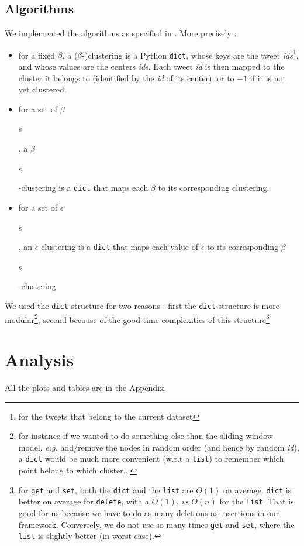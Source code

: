 \documentclass[a4paper,10pt]{article}
\begin{document}
	\subsection{Algorithms}
		We implemented the algorithms as specified in \cite{Chan2017}. More precisely :
		\begin{itemize}
			\item for a fixed $\beta$, a ($\beta$-)clustering is a Python \texttt{dict}, whose keys are the tweet \textit{ids}\footnote{for the tweets that belong to the current dataset}, and whose values are the centers \textit{ids}. Each tweet \textit{id} is then mapped to the cluster it belongs to (identified by the \textit{id} of its center), or to $-1$ if it is not yet clustered.
			\item for a set of $\beta$\begin{tiny}s\end{tiny}, a $\beta$\begin{tiny}s\end{tiny}-clustering is a \texttt{dict} that maps each $\beta$ to its corresponding clustering.
			\item for a set of $\epsilon$\begin{tiny}s\end{tiny}, an $\epsilon$-clustering is a \texttt{dict} that maps each value of $\epsilon$ to its corresponding $\beta$\begin{tiny}s\end{tiny}-clustering
		\end{itemize}
		We used the \texttt{dict} structure for two reasons : first the \texttt{dict} structure is more modular\footnote{for instance if we wanted to do something else than the sliding window model, \textit{e.g.} add/remove the nodes in random order (and hence by random \textit{id}), a \texttt{dict} would be much more convenient (w.r.t a \texttt{list}) to remember which point belong to which cluster...}, second because of the good time complexities of this structure\footnote{for \texttt{get} and \texttt{set}, both the \texttt{dict} and the \texttt{list} are $O(1)$ on average. \texttt{dict} is better on average for \texttt{delete}, with a $O(1)$, \textit{vs} $O(n)$ for the \texttt{list}. That is good for us because we have to do as many deletions as insertions in our framework. Conversely, we do not use so many times \texttt{get} and \texttt{set}, where the \texttt{list} is slightly better (in worst case).}
\section{Analysis}
All the plots and tables are in the Appendix.
\end{document}
